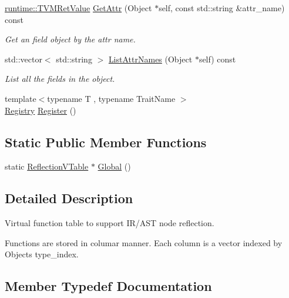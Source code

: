 \begin{DoxyCompactItemize}
\hyperlink{classtvm_1_1runtime_1_1TVMRetValue}{runtime\+::\+T\+V\+M\+Ret\+Value} \hyperlink{classtvm_1_1ReflectionVTable_ae44960abd107dbdad04ab7a548db47e1}{Get\+Attr} (Object $\ast$self, const std\+::string \&attr\+\_\+name) const 
\begin{DoxyCompactList}\small\item\em Get an field object by the attr name. \end{DoxyCompactList}\item 
std\+::vector$<$ std\+::string $>$ \hyperlink{classtvm_1_1ReflectionVTable_ae8ea4f24e5b7e905c3a5f3f14b994707}{List\+Attr\+Names} (Object $\ast$self) const 
\begin{DoxyCompactList}\small\item\em List all the fields in the object. \end{DoxyCompactList}\item 
{\footnotesize template$<$typename T , typename Trait\+Name $>$ }\\\hyperlink{classtvm_1_1ReflectionVTable_1_1Registry}{Registry} \hyperlink{classtvm_1_1ReflectionVTable_a775a9d85f429302c05e06ddc64eb9456}{Register} ()
\end{DoxyCompactItemize}
\subsection*{Static Public Member Functions}
\begin{DoxyCompactItemize}
\item 
static \hyperlink{classtvm_1_1ReflectionVTable}{Reflection\+V\+Table} $\ast$ \hyperlink{classtvm_1_1ReflectionVTable_acf555f668f940322ab7b3dea1a45bd95}{Global} ()
\end{DoxyCompactItemize}


\subsection{Detailed Description}
Virtual function table to support I\+R/\+A\+ST node reflection. 

Functions are stored in columar manner. Each column is a vector indexed by Object\textquotesingle{}s type\+\_\+index. 

\subsection{Member Typedef Documentation}
